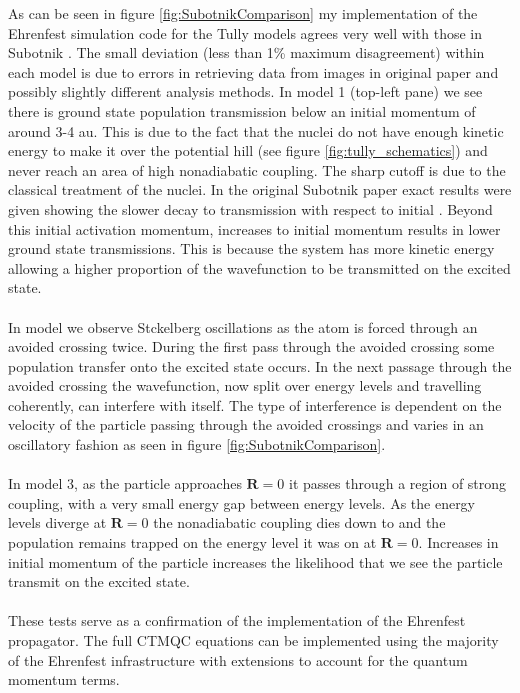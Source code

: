As can  be seen in figure \ref{fig:SubotnikComparison} my implementation of the Ehrenfest simulation code for the Tully models agrees very well with those in Subotnik \cite{SubotnikMomentumEhrenfest}. The small deviation (less than 1\% maximum disagreement) within each model is due to errors in retrieving data from images in original paper and possibly slightly different analysis methods. In model 1 (top-left pane) we see there is  ground state population transmission below an initial momentum of around 3-4 au. This is due to the fact that the nuclei do not have enough kinetic energy to make it over the potential hill (see figure \ref{fig:tully_schematics}) and never reach an area of high nonadiabatic coupling. The sharp cutoff is due to the classical treatment of the nuclei. In the original Subotnik \cite{SubotnikMomentumEhrenfest} paper exact results were given showing the slower decay to  transmission with respect to initial . Beyond this initial activation momentum, increases to initial momentum results in lower ground state transmissions. This is because the system has more kinetic energy allowing a higher proportion of the wavefunction to be transmitted on the excited state.
\\\\
In model  we observe Stckelberg oscillations as the atom is forced through an avoided crossing twice. During the first pass through the avoided crossing some population transfer onto the excited state occurs. In the next passage through the avoided crossing the wavefunction, now split over  energy levels and travelling coherently, can interfere with itself. The type of interference is dependent on the velocity of the particle passing through the avoided crossings and varies in an oscillatory fashion as seen in figure \ref{fig:SubotnikComparison}.
\\\\
In model 3, as the particle approaches $\mathbf{R}=0$ it passes through a region of strong coupling, with a very small energy gap between energy levels. As the  energy levels diverge at $\mathbf{R}=0$ the nonadiabatic coupling dies down to  and the population remains trapped on the energy level it was on at $\mathbf{R}=0$. Increases in initial momentum of the particle increases the likelihood that we see the particle transmit on the excited state.
\\\\
These tests serve as a confirmation of the implementation of the Ehrenfest propagator. The full CTMQC equations can be implemented using the majority of the Ehrenfest infrastructure with extensions to account for the quantum momentum terms.

